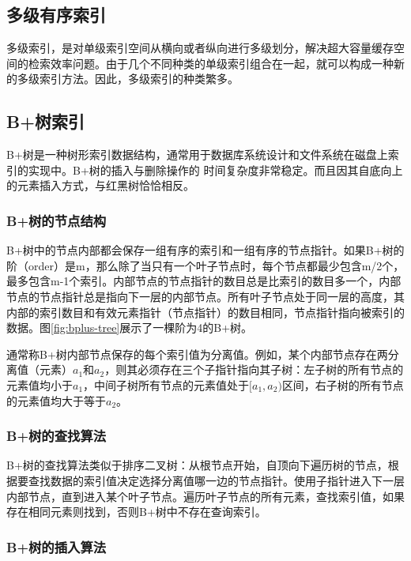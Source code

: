 \subsection{多级有序索引}

多级索引，是对单级索引空间从横向或者纵向进行多级划分，解决超大容量缓存空间的检索效率问题。由于几个不同种类的单级索引组合在一起，就可以构成一种新的多级索引方法。因此，多级索引的种类繁多。

\subsection{B+树索引}
B+树\cite{bplustree2012}是一种树形索引数据结构，通常用于数据库系统设计和文件系统在磁盘上索引的实现中。B+树的插入与删除操作的 时间复杂度非常稳定。而且因其自底向上的元素插入方式，与红黑树恰恰相反。

\subsubsection{B+树的节点结构}

B+树中的节点内部都会保存一组有序的索引和一组有序的节点指针。如果B+树的阶（order）是m，那么除了当只有一个叶子节点时，每个节点都最少包含m/2个，最多包含m-1个索引。内部节点的节点指针的数目总是比索引的数目多一个，内部节点的节点指针总是指向下一层的内部节点。所有叶子节点处于同一层的高度，其内部的索引数目和有效元素指针（节点指针）的数目相同，节点指针指向被索引的数据。图\ref{fig:bplus-tree}展示了一棵阶为4的B+树。

通常称B+树内部节点保存的每个索引值为分离值。例如，某个内部节点存在两分离值（元素）$a_1$和$a_2$，则其必须存在三个子指针指向其子树：左子树的所有节点的元素值均小于$a_1$，中间子树所有节点的元素值处于$[a_1,a_2)$区间，右子树的所有节点的元素值均大于等于$a_2$。

\subsubsection{B+树的查找算法}

B+树的查找算法类似于排序二叉树：从根节点开始，自顶向下遍历树的节点，根据要查找数据的索引值决定选择分离值哪一边的节点指针。使用子指针进入下一层内部节点，直到进入某个叶子节点。遍历叶子节点的所有元素，查找索引值，如果存在相同元素则找到，否则B+树中不存在查询索引。

\subsubsection{B+树的插入算法}

